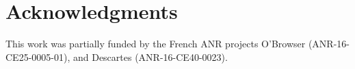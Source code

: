
\section*{Acknowledgments}

This work was partially
funded by
the French ANR projects O'Browser (\mbox{ANR-16-CE25-0005-01}), and Descartes
(\mbox{ANR-16-CE40-0023}).



